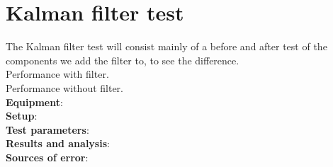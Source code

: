 \section{Kalman filter test}
The Kalman filter test will consist mainly of a before and after test of the components we add the filter to, to see the difference.\\
Performance with filter.\\
Performance without filter.\\

\textbf{Equipment}:
\\
\textbf{Setup}:
\\
\textbf{Test parameters}:
\\
\textbf{Results and analysis}:
\\
\textbf{Sources of error}: